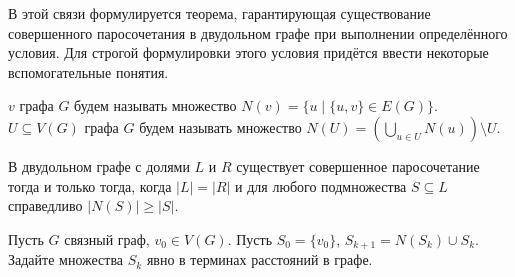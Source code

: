 В этой связи формулируется теорема, гарантирующая существование совершенного паросочетания в двудольном графе при выполнении определённого условия.
Для строгой формулировки этого условия придётся ввести некоторые вспомогательные понятия.

\begin{definition}
     $ v $ графа $ G $ будем называть множество $ N(v) = \{ u \mid \{u, v\} \in E(G) \} $.
     $ U \subseteq V(G) $ графа $ G $ будем называть множество $ N(U) = \left( \bigcup_{u \in U} N(u) \right) \setminus U $.
\end{definition}

\begin{theorem}
    В двудольном графе с долями $ L $ и $ R $ существует совершенное паросочетание тогда и только тогда,
    когда $ |L| = |R| $ и для любого подмножества $ S \subseteq L $ справедливо $ |N(S)| \geqslant |S| $.
\end{theorem}

\begin{Exercise}[counter=SecExercise, label={exercise:almost_BFS}]
    \noindent
    Пусть $ G $ связный граф, $ v_0 \in V(G) $.
    Пусть $ S_0 = \{ v_0 \} $, $ S_{k+1} = N(S_k) \cup S_k $.
    Задайте множества $ S_k $ явно в терминах расстояний в графе.
\end{Exercise}

